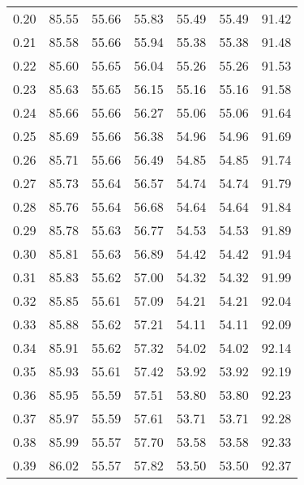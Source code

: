 \begin{tabular}{|c|c|c|c|c|c|c|}
      0.20 &     85.55 &     55.66 &      55.83 &   55.49 &      55.49 &         91.42 \\
      0.21 &     85.58 &     55.66 &      55.94 &   55.38 &      55.38 &         91.48 \\
      0.22 &     85.60 &     55.65 &      56.04 &   55.26 &      55.26 &         91.53 \\
      0.23 &     85.63 &     55.65 &      56.15 &   55.16 &      55.16 &         91.58 \\
      0.24 &     85.66 &     55.66 &      56.27 &   55.06 &      55.06 &         91.64 \\
      0.25 &     85.69 &     55.66 &      56.38 &   54.96 &      54.96 &         91.69 \\
      0.26 &     85.71 &     55.66 &      56.49 &   54.85 &      54.85 &         91.74 \\
      0.27 &     85.73 &     55.64 &      56.57 &   54.74 &      54.74 &         91.79 \\
      0.28 &     85.76 &     55.64 &      56.68 &   54.64 &      54.64 &         91.84 \\
      0.29 &     85.78 &     55.63 &      56.77 &   54.53 &      54.53 &         91.89 \\
      0.30 &     85.81 &     55.63 &      56.89 &   54.42 &      54.42 &         91.94 \\
      0.31 &     85.83 &     55.62 &      57.00 &   54.32 &      54.32 &         91.99 \\
      0.32 &     85.85 &     55.61 &      57.09 &   54.21 &      54.21 &         92.04 \\
      0.33 &     85.88 &     55.62 &      57.21 &   54.11 &      54.11 &         92.09 \\
      0.34 &     85.91 &     55.62 &      57.32 &   54.02 &      54.02 &         92.14 \\
      0.35 &     85.93 &     55.61 &      57.42 &   53.92 &      53.92 &         92.19 \\
      0.36 &     85.95 &     55.59 &      57.51 &   53.80 &      53.80 &         92.23 \\
      0.37 &     85.97 &     55.59 &      57.61 &   53.71 &      53.71 &         92.28 \\
      0.38 &     85.99 &     55.57 &      57.70 &   53.58 &      53.58 &         92.33 \\
      0.39 &     86.02 &     55.57 &      57.82 &   53.50 &      53.50 &         92.37 \\

\end{tabular}
